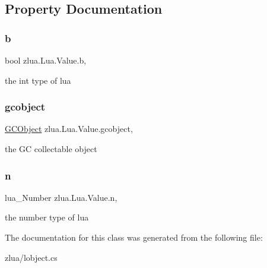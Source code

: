 \subsection{Property Documentation}
\mbox{\label{classzlua_1_1_lua_1_1_value_a2ab66efb3c8af25dc58ee788f7f2d243}} 
\subsubsection{\texorpdfstring{b}{b}}
{\footnotesize\ttfamily bool zlua.\+Lua.\+Value.\+b\hspace{0.3cm}{\ttfamily [get]}, {\ttfamily [set]}}



the int type of lua 

\mbox{\label{classzlua_1_1_lua_1_1_value_aa3721ec46d8ef772d1320223708d1ff1}} 
\subsubsection{\texorpdfstring{gcobject}{gcobject}}
{\footnotesize\ttfamily \mbox{\hyperlink{classzlua_1_1_lua_1_1_g_c_object}{G\+C\+Object}} zlua.\+Lua.\+Value.\+gcobject\hspace{0.3cm}{\ttfamily [get]}, {\ttfamily [set]}}



the GC collectable object 

\mbox{\label{classzlua_1_1_lua_1_1_value_ad1d47c91a55ca1bb270a22c7c318367b}} 
\subsubsection{\texorpdfstring{n}{n}}
{\footnotesize\ttfamily lua\+\_\+\+Number zlua.\+Lua.\+Value.\+n\hspace{0.3cm}{\ttfamily [get]}, {\ttfamily [set]}}



the number type of lua 



The documentation for this class was generated from the following file\+:\begin{DoxyCompactItemize}
\item 
zlua/lobject.\+cs\end{DoxyCompactItemize}
